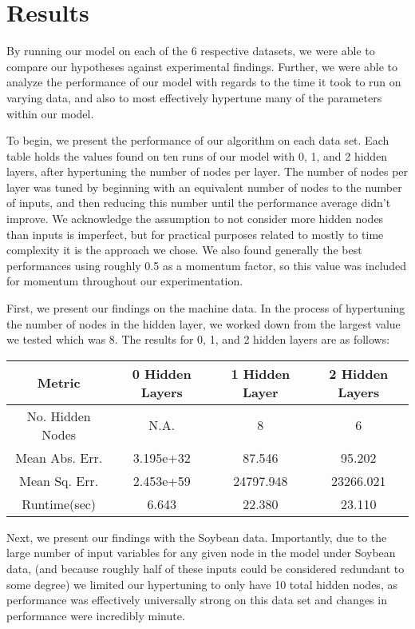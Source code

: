 \documentclass[twoside,11pt]{article}
\begin{document}
\section{Results}
By running our model on each of the 6 respective datasets, we were able to compare our hypotheses against experimental findings. Further, we were able
to analyze the performance of our model with regards to the time it took to run on varying data, and also to most effectively hypertune
many of the parameters within our model.

To begin, we present the performance of our algorithm on each data set. Each table holds the values found on ten runs of our model with 0, 1, and 2 hidden layers,
after hypertuning the number of nodes per layer. The number of nodes per layer was tuned by beginning with an equivalent number of nodes to the number of inputs,
and then reducing this number until the performance average didn't improve. We acknowledge the assumption to not consider more hidden nodes than inputs is imperfect,
but for practical purposes related to mostly to time complexity it is the approach we chose. We also found generally the best performances using roughly 0.5 as a
momentum factor, so this value was included for momentum throughout our experimentation.

First, we present our findings on the machine data. In the process of hypertuning the number of nodes in the hidden layer, we worked down from the largest
value we tested which was 8. The results for 0, 1, and 2 hidden layers are as follows: 
\begin{center}
	\begin{tabular}{|c c c c|}
		\hline
		Metric & 0 Hidden Layers & 1 Hidden Layer & 2 Hidden Layers \\ [0.5ex]
		\hline \hline
		No. Hidden Nodes & N.A. & 8 & 6 \\
		\hline
		Mean Abs. Err. & 3.195e+32 & 87.546 & 95.202 \\
		\hline
		Mean Sq. Err. & 2.453e+59 & 24797.948 & 23266.021 \\
		\hline
		Runtime(sec) & 6.643 & 22.380 & 23.110 \\
		\hline
	\end{tabular}
\end{center}

Next, we present our findings with the Soybean data. Importantly, due to the large number of input variables
for any given node in the model under Soybean data, (and because roughly half of these inputs could be considered
redundant to some degree) we limited our hypertuning to only have 10 total hidden nodes,
as performance was effectively universally strong on this data set and changes in performance were incredibly minute.
\end{document}
